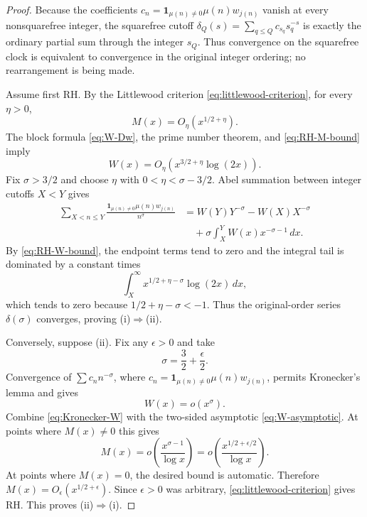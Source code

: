 \documentclass[11pt]{amsart}
\numberwithin{equation}{section}
\theoremstyle{plain}
\theoremstyle{definition}
\theoremstyle{remark}
\begin{document}
\begin{proof}
Because the coefficients $c_n=\mathbf1_{\mu(n)\ne0}\mu(n)w_{j(n)}$
vanish at every nonsquarefree integer, the squarefree cutoff
$\delta_Q(s)=\sum_{q\le Q}c_{s_q}s_q^{-s}$ is exactly the ordinary partial
sum through the integer $s_Q$.  Thus convergence on the squarefree clock is
equivalent to convergence in the original integer ordering; no rearrangement
is being made.

Assume first RH.  By the Littlewood criterion
\eqref{eq:littlewood-criterion}, for every $\eta>0$,
\begin{equation}
M(x)=O_\eta\left(x^{1/2+\eta}\right).
\label{eq:RH-M-bound}
\end{equation}
The block formula \eqref{eq:W-Dw}, the prime number theorem, and
\eqref{eq:RH-M-bound} imply
\begin{equation}
W(x)=O_\eta\left(x^{3/2+\eta}\log(2x)\right).
\label{eq:RH-W-bound}
\end{equation}
Fix $\sigma>3/2$ and choose $\eta$ with
$0<\eta<\sigma-3/2$.  Abel summation between integer cutoffs $X<Y$ gives
\begin{align}
\sum_{X<n\le Y}
\frac{\mathbf1_{\mu(n)\ne0}\mu(n)w_{j(n)}}{n^\sigma}
&=W(Y)Y^{-\sigma}-W(X)X^{-\sigma}
\label{eq:delta-tail-Abel-one}\\
&\quad+\sigma\int_X^YW(x)x^{-\sigma-1}\,dx.
\label{eq:delta-tail-Abel-two}
\end{align}
By \eqref{eq:RH-W-bound}, the endpoint terms tend to zero and the integral
tail is dominated by a constant times
\begin{equation}
\int_X^\infty x^{1/2+\eta-\sigma}\log(2x)\,dx,
\label{eq:delta-tail-majorant}
\end{equation}
which tends to zero because $1/2+\eta-\sigma<-1$.  Thus the original-order
series $\delta(\sigma)$ converges, proving (i)$\Rightarrow$(ii).

Conversely, suppose (ii).  Fix any $\epsilon>0$ and take
\begin{equation}
\sigma=\frac32+\frac{\epsilon}{2}.
\label{eq:sigma-choice}
\end{equation}
Convergence of $\sum c_nn^{-\sigma}$, where
$c_n=\mathbf1_{\mu(n)\ne0}\mu(n)w_{j(n)}$, permits Kronecker's lemma and
gives
\begin{equation}
W(x)=o\left(x^\sigma\right).
\label{eq:Kronecker-W}
\end{equation}
Combine \eqref{eq:Kronecker-W} with the two-sided asymptotic
\eqref{eq:W-asymptotic}.  At points where $M(x)\ne0$ this gives
\begin{equation}
M(x)=o\left(\frac{x^{\sigma-1}}{\log x}\right)
=o\left(\frac{x^{1/2+\epsilon/2}}{\log x}\right).
\label{eq:M-from-delta}
\end{equation}
At points where $M(x)=0$, the desired bound is automatic.  Therefore
$M(x)=O_\epsilon(x^{1/2+\epsilon})$.  Since $\epsilon>0$ was arbitrary,
\eqref{eq:littlewood-criterion} gives RH.  This proves
(ii)$\Rightarrow$(i).


\end{proof}
\end{document}

